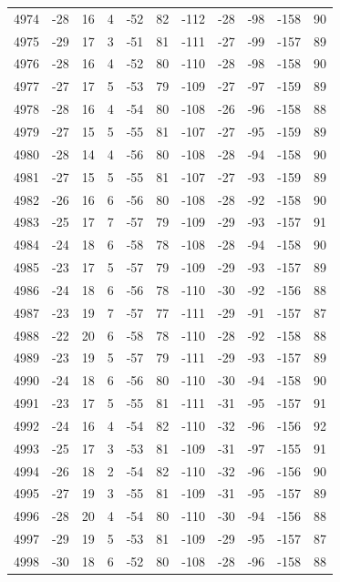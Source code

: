\begin{table}[H]
\begin{tabular}{lllllllllll}
4974 & -28 & 16 & 4 & -52 & 82 & -112 & -28 & -98 & -158 & 90 \\
4975 & -29 & 17 & 3 & -51 & 81 & -111 & -27 & -99 & -157 & 89 \\
4976 & -28 & 16 & 4 & -52 & 80 & -110 & -28 & -98 & -158 & 90 \\
4977 & -27 & 17 & 5 & -53 & 79 & -109 & -27 & -97 & -159 & 89 \\
4978 & -28 & 16 & 4 & -54 & 80 & -108 & -26 & -96 & -158 & 88 \\
4979 & -27 & 15 & 5 & -55 & 81 & -107 & -27 & -95 & -159 & 89 \\
4980 & -28 & 14 & 4 & -56 & 80 & -108 & -28 & -94 & -158 & 90 \\
4981 & -27 & 15 & 5 & -55 & 81 & -107 & -27 & -93 & -159 & 89 \\
4982 & -26 & 16 & 6 & -56 & 80 & -108 & -28 & -92 & -158 & 90 \\
4983 & -25 & 17 & 7 & -57 & 79 & -109 & -29 & -93 & -157 & 91 \\
4984 & -24 & 18 & 6 & -58 & 78 & -108 & -28 & -94 & -158 & 90 \\
4985 & -23 & 17 & 5 & -57 & 79 & -109 & -29 & -93 & -157 & 89 \\
4986 & -24 & 18 & 6 & -56 & 78 & -110 & -30 & -92 & -156 & 88 \\
4987 & -23 & 19 & 7 & -57 & 77 & -111 & -29 & -91 & -157 & 87 \\
4988 & -22 & 20 & 6 & -58 & 78 & -110 & -28 & -92 & -158 & 88 \\
4989 & -23 & 19 & 5 & -57 & 79 & -111 & -29 & -93 & -157 & 89 \\
4990 & -24 & 18 & 6 & -56 & 80 & -110 & -30 & -94 & -158 & 90 \\
4991 & -23 & 17 & 5 & -55 & 81 & -111 & -31 & -95 & -157 & 91 \\
4992 & -24 & 16 & 4 & -54 & 82 & -110 & -32 & -96 & -156 & 92 \\
4993 & -25 & 17 & 3 & -53 & 81 & -109 & -31 & -97 & -155 & 91 \\
4994 & -26 & 18 & 2 & -54 & 82 & -110 & -32 & -96 & -156 & 90 \\
4995 & -27 & 19 & 3 & -55 & 81 & -109 & -31 & -95 & -157 & 89 \\
4996 & -28 & 20 & 4 & -54 & 80 & -110 & -30 & -94 & -156 & 88 \\
4997 & -29 & 19 & 5 & -53 & 81 & -109 & -29 & -95 & -157 & 87 \\
4998 & -30 & 18 & 6 & -52 & 80 & -108 & -28 & -96 & -158 & 88 \\

\end{tabular}
\end{table}
